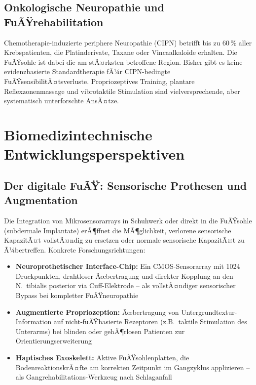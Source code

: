 ﻿\documentclass[12pt,a4paper]{report}
\theoremstyle{plain}
\theoremstyle{definition}
\theoremstyle{remark}
\begin{document}
\subsection{Onkologische Neuropathie und FuÃŸrehabilitation}

Chemotherapie-induzierte periphere Neuropathie (CIPN) betrifft
bis zu 60\,\% aller Krebspatienten, die Platinderivate,
Taxane oder Vincaalkaloide erhalten. Die FuÃŸsohle ist dabei
die am stÃ¤rksten betroffene Region. Bisher gibt es keine
evidenzbasierte Standardtherapie fÃ¼r CIPN-bedingte
FuÃŸsensibilitÃ¤tsverluste. Propriozeptives Training, plantare
Reflexzonenmassage und vibrotaktile Stimulation sind
vielversprechende, aber systematisch unterforschte AnsÃ¤tze.

\section{Biomedizintechnische Entwicklungsperspektiven}

\subsection{Der digitale FuÃŸ: Sensorische Prothesen und Augmentation}

Die Integration von Mikrosensorarrays in Schuhwerk oder direkt in
die FuÃŸsohle (subdermale Implantate) erÃ¶ffnet die MÃ¶glichkeit,
verlorene sensorische KapazitÃ¤t vollstÃ¤ndig zu ersetzen oder
normale sensorische KapazitÃ¤t zu Ã¼bertreffen. Konkrete
Forschungsrichtungen:

\begin{itemize}
\item \textbf{Neuroprothetischer Interface-Chip:} Ein CMOS-Sensorarray
  mit 1024 Druckpunkten, drahtloser Ãœbertragung und direkter
  Kopplung an den N.\ tibialis posterior via Cuff-Elektrode --
  als vollstÃ¤ndiger sensorischer Bypass bei kompletter FuÃŸneuropathie
\item \textbf{Augmentierte Propriozeption:} Ãœbertragung von
  Untergrundtextur-Information auf nicht-fuÃŸbasierte Rezeptoren
  (z.B.\ taktile Stimulation des Unterarms) bei blinden oder
  gehÃ¶rlosen Patienten zur Orientierungserweiterung
\item \textbf{Haptisches Exoskelett:} Aktive FuÃŸsohlenplatten,
  die BodenreaktionskrÃ¤fte am korrekten Zeitpunkt im Gangzyklus
  applizieren -- als Gangrehabilitations-Werkzeug nach Schlaganfall
\end{itemize}
\end{document}
